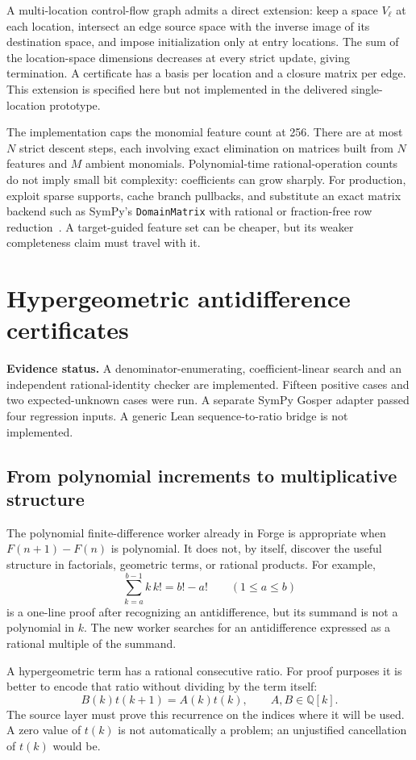 \documentclass[11pt,letterpaper]{article}
\newcommand{\Q}{\mathbb Q}\newcommand{\R}{\mathbb R}\newcommand{\N}{\mathbb N}
\newcommand{\code}[1]{\texttt{#1}}
\newcommand{\status}[1]{\par\smallskip\noindent\textbf{Evidence status.} #1\par\smallskip}
\theoremstyle{definition}\newtheorem{definition}[theorem]{Definition}
\theoremstyle{remark}\newtheorem{remark}[theorem]{Remark}
\begin{document}
A multi-location control-flow graph admits a direct extension: keep a space
$V_\ell$ at each location, intersect an edge source space with the inverse
image of its destination space, and impose initialization only at entry
locations. The sum of the location-space dimensions decreases at every strict
update, giving termination. A certificate has a basis per location and a
closure matrix per edge. This extension is specified here but not implemented
in the delivered single-location prototype.

The implementation caps the monomial feature count at 256. There are at most
$N$ strict descent steps, each involving exact elimination on matrices built
from $N$ features and $M$ ambient monomials. Polynomial-time rational-operation
counts do not imply small bit complexity: coefficients can grow sharply.
For production, exploit sparse supports, cache branch pullbacks, and substitute
an exact matrix backend such as SymPy's \code{DomainMatrix} with rational or
fraction-free row reduction~\cite{domainmatrix}. A target-guided feature set can
be cheaper, but its weaker completeness claim must travel with it.

\section{Hypergeometric antidifference certificates}
\label{sec:gosper}
\status{A denominator-enumerating, coefficient-linear search and an independent
rational-identity checker are implemented. Fifteen positive cases and two
expected-unknown cases were run. A separate SymPy Gosper adapter passed four
regression inputs. A generic Lean sequence-to-ratio bridge is not implemented.}

\subsection{From polynomial increments to multiplicative structure}
The polynomial finite-difference worker already in Forge is appropriate when
$F(n+1)-F(n)$ is polynomial. It does not, by itself, discover the useful
structure in factorials, geometric terms, or rational products. For example,
\[
 \sum_{k=a}^{b-1} k\,k!=b!-a!\qquad(1\le a\le b)
\]
is a one-line proof after recognizing an antidifference, but its summand is not
a polynomial in $k$. The new worker searches for an antidifference expressed
as a rational multiple of the summand.

A hypergeometric term has a rational consecutive ratio. For proof purposes it
is better to encode that ratio without dividing by the term itself:
\begin{equation}
 B(k)t(k+1)=A(k)t(k),\qquad A,B\in\Q[k].
 \label{eq:ratio}
\end{equation}
The source layer must prove this recurrence on the indices where it will be
used. A zero value of $t(k)$ is not automatically a problem; an unjustified
cancellation of $t(k)$ would be.
\end{document}
